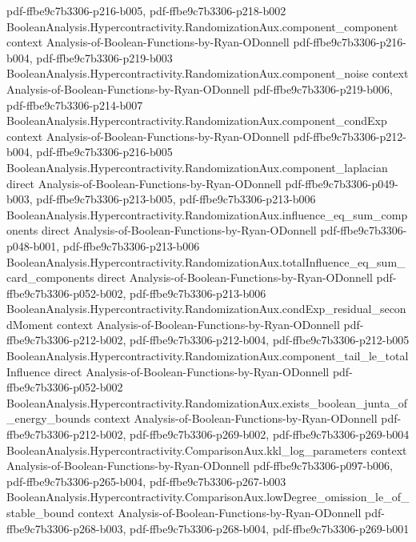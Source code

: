 \begin{theorem}
  {pdf-ffbe9c7b3306-p216-b005,
    pdf-ffbe9c7b3306-p218-b002}
\proofstep
  {BooleanAnalysis.Hypercontractivity.RandomizationAux.component_component}
  {context}
  {Analysis-of-Boolean-Functions-by-Ryan-ODonnell}
  {pdf-ffbe9c7b3306-p216-b004,
    pdf-ffbe9c7b3306-p219-b003}
\proofstep
  {BooleanAnalysis.Hypercontractivity.RandomizationAux.component_noise}
  {context}
  {Analysis-of-Boolean-Functions-by-Ryan-ODonnell}
  {pdf-ffbe9c7b3306-p219-b006,
    pdf-ffbe9c7b3306-p214-b007}
\proofstep
  {BooleanAnalysis.Hypercontractivity.RandomizationAux.component_condExp}
  {context}
  {Analysis-of-Boolean-Functions-by-Ryan-ODonnell}
  {pdf-ffbe9c7b3306-p212-b004,
    pdf-ffbe9c7b3306-p216-b005}
\proofstep
  {BooleanAnalysis.Hypercontractivity.RandomizationAux.component_laplacian}
  {direct}
  {Analysis-of-Boolean-Functions-by-Ryan-ODonnell}
  {pdf-ffbe9c7b3306-p049-b003,
    pdf-ffbe9c7b3306-p213-b005,
    pdf-ffbe9c7b3306-p213-b006}
\proofstep
  {BooleanAnalysis.Hypercontractivity.RandomizationAux.influence_eq_sum_components}
  {direct}
  {Analysis-of-Boolean-Functions-by-Ryan-ODonnell}
  {pdf-ffbe9c7b3306-p048-b001,
    pdf-ffbe9c7b3306-p213-b006}
\proofstep
  {BooleanAnalysis.Hypercontractivity.RandomizationAux.totalInfluence_eq_sum_card_components}
  {direct}
  {Analysis-of-Boolean-Functions-by-Ryan-ODonnell}
  {pdf-ffbe9c7b3306-p052-b002,
    pdf-ffbe9c7b3306-p213-b006}
\proofstep
  {BooleanAnalysis.Hypercontractivity.RandomizationAux.condExp_residual_secondMoment}
  {context}
  {Analysis-of-Boolean-Functions-by-Ryan-ODonnell}
  {pdf-ffbe9c7b3306-p212-b002,
    pdf-ffbe9c7b3306-p212-b004,
    pdf-ffbe9c7b3306-p212-b005}
\proofstep
  {BooleanAnalysis.Hypercontractivity.RandomizationAux.component_tail_le_totalInfluence}
  {direct}
  {Analysis-of-Boolean-Functions-by-Ryan-ODonnell}
  {pdf-ffbe9c7b3306-p052-b002}
\proofstep
  {BooleanAnalysis.Hypercontractivity.RandomizationAux.exists_boolean_junta_of_energy_bounds}
  {context}
  {Analysis-of-Boolean-Functions-by-Ryan-ODonnell}
  {pdf-ffbe9c7b3306-p212-b002,
    pdf-ffbe9c7b3306-p269-b002,
    pdf-ffbe9c7b3306-p269-b004}
\proofstep
  {BooleanAnalysis.Hypercontractivity.ComparisonAux.kkl_log_parameters}
  {context}
  {Analysis-of-Boolean-Functions-by-Ryan-ODonnell}
  {pdf-ffbe9c7b3306-p097-b006,
    pdf-ffbe9c7b3306-p265-b004,
    pdf-ffbe9c7b3306-p267-b003}
\proofstep
  {BooleanAnalysis.Hypercontractivity.ComparisonAux.lowDegree_omission_le_of_stable_bound}
  {context}
  {Analysis-of-Boolean-Functions-by-Ryan-ODonnell}
  {pdf-ffbe9c7b3306-p268-b003,
    pdf-ffbe9c7b3306-p268-b004,
    pdf-ffbe9c7b3306-p269-b001}

\end{theorem}
